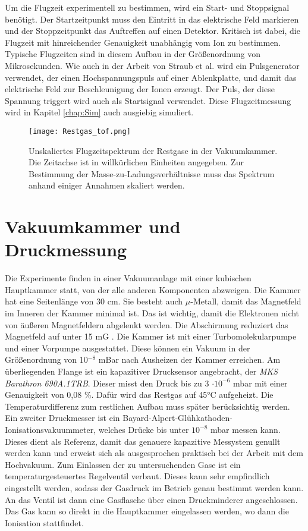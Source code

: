 Um die Flugzeit experimentell zu bestimmen, wird ein Start- und Stoppsignal benötigt. Der Startzeitpunkt muss den Eintritt in das elektrische Feld markieren und der Stoppzeitpunkt das Auftreffen auf einen Detektor. Kritisch ist dabei, die Flugzeit mit hinreichender Genauigkeit unabhängig vom Ion zu bestimmen. Typische Flugzeiten sind in diesem Aufbau in der Größenordnung von Mikrosekunden. Wie auch in der Arbeit von Straub et al. wird ein Pulsgenerator verwendet, der einen Hochspannungspuls auf einer Ablenkplatte, und damit das elektrische Feld zur Beschleunigung der Ionen erzeugt. Der Puls, der diese Spannung triggert wird auch als Startsignal verwendet. Diese Flugzeitmessung wird in Kapitel \ref{chap:Sim} auch ausgiebig simuliert.

\begin{figure}
    \centering
    \hspace*{-.8cm}
    \texttt{[image: Restgas\_tof.png]}
    \caption[Flugzeitspektrum der Restgase]{Unskaliertes Flugzeitspektrum der Restgase in der Vakuumkammer. Die Zeitachse ist in willkürlichen Einheiten angegeben. Zur Bestimmung der Masse-zu-Ladungsverhältnisse muss das Spektrum anhand einiger Annahmen skaliert werden.}
    \label{fig:rest_tof}
\end{figure}

\section{Vakuumkammer und Druckmessung}
Die Experimente finden in einer Vakuumanlage mit einer kubischen Hauptkammer statt, von der alle anderen Komponenten abzweigen. Die Kammer hat eine Seitenlänge von 30 cm. Sie besteht auch $\mu$-Metall, damit das Magnetfeld im Inneren der Kammer minimal ist. Das ist wichtig, damit die Elektronen nicht von äußeren Magnetfeldern abgelenkt werden. Die Abschirmung reduziert das Magnetfeld auf unter 15 mG \cite{Holzte}. Die Kammer ist mit einer Turbomolekularpumpe und einer Vorpumpe ausgestattet. Diese können ein Vakuum in der Größenordnung von 10$^{-8}$ mBar nach Ausheizen der Kammer erreichen. Am überliegenden Flange ist ein kapazitiver Drucksensor angebracht, der \textit{MKS Barathron 690A.1TRB}. Dieser misst den Druck bis zu 3 $\cdot 10^{-6}$ mbar mit einer Genauigkeit von 0,08 \%. Dafür wird das Restgas auf \ang{45}C aufgeheizt. Die Temperaturdifferenz zum restlichen Aufbau muss später berücksichtig werden. Ein zweiter Druckmesser ist ein Bayard-Alpert-Glühkathoden-Ionisationsvakuummeter, welches Drücke bis unter $10^{-8}$ mbar messen kann. Dieses dient als Referenz, damit das genauere kapazitive Messystem genullt werden kann und erweist sich als ausgesprochen praktisch bei der Arbeit mit dem Hochvakuum.
Zum Einlassen der zu untersuchenden Gase ist ein temperaturgesteuertes Regelventil verbaut. Dieses kann sehr empfindlich eingestellt werden, sodass der Gasdruck im Betrieb genau bestimmt werden kann. An das Ventil ist dann eine Gasflasche über einen Druckminderer angeschlossen. Das Gas kann so direkt in die Hauptkammer eingelassen werden, wo dann die Ionisation stattfindet.

